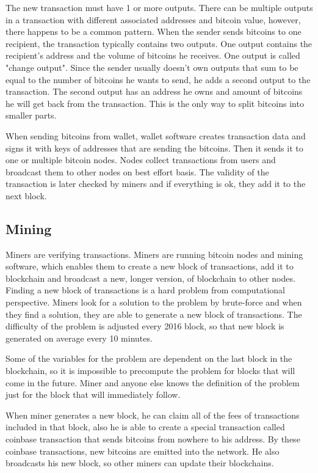 \documentclass[
  digital, %
  table,   %
  lof,     %
  lot,     %
  oneside
]{fithesis3}
\begin{document}
The new transaction must have 1 or more outputs.
There can be multiple outputs in a transaction with different associated addresses and bitcoin value,
however, there happens to be a common pattern. When the sender sends bitcoins to one recipient,
the transaction typically contains two outputs.
One output contains the recipient's address and the volume of bitcoins he receives.
One output is called "change output". Since the sender usually doesn't own outputs that sum to be equal to the number of bitcoins
he wants to send, he adds a second output to the transaction.
The second output has an address he owns and amount of bitcoins he will get back from the transaction.
 This is the only way to split bitcoins into smaller parts. 

When sending bitcoins from wallet,
 wallet software creates transaction data and signs it with keys of addresses that are sending the bitcoins.
 Then it sends it to one or multiple bitcoin nodes.
Nodes collect transactions from users and broadcast them to other nodes on best effort basis.
The validity of the transaction is later checked by miners and if everything is ok, they add it to the next block.

\subsection{Mining}

Miners are verifying transactions.
Miners are running bitcoin nodes and mining software, which enables them to create a new block of transactions, add it to blockchain and broadcast a new, longer version, of blockchain to other nodes.
Finding a new block of transactions is a hard problem from computational perspective.
Miners look for a solution to the problem by brute-force and when they find a solution, they are able to generate a new block of transactions. The difficulty of the problem is adjusted every 2016 block,
so that new block is generated on average every 10 minutes.

Some of the variables for the problem are dependent on the last block in the blockchain, so it is impossible
to precompute the problem for blocks that will come in the future. 
Miner and anyone else knows the definition of the problem just for the block that will immediately follow.

When miner generates a new block, he can claim all of the fees of transactions included in that block,
also he is able to create a special transaction called coinbase transaction that sends bitcoins from nowhere to his address. By these coinbase transactions, new bitcoins are emitted into the network.
He also broadcasts his new block, so other miners can update their blockchains. 
\end{document}
